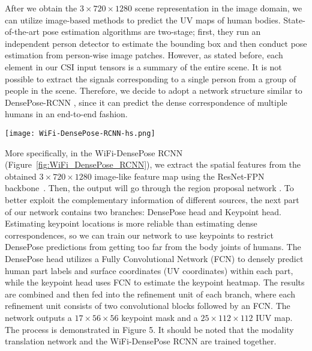 \documentclass[sigconf, anonymous=false]{acmart}
\begin{document}
After we obtain the $3 \times 720 \times 1280$ scene representation in the image domain, we can utilize image-based methods to predict the UV maps of human bodies. State-of-the-art pose estimation algorithms are two-stage; first, they run an independent person detector to estimate the bounding box and then conduct pose estimation from person-wise image patches. However, as stated before, each element in our CSI input tensors is a summary of the entire scene. It is not possible to extract the signals corresponding to a single person from a group of people in the scene. Therefore, we decide to adopt a network structure similar to DensePose-RCNN \cite{DensePose}, since it can predict the dense correspondence of multiple humans in an end-to-end fashion. 

\begin{figure*}[!htb]
\centering
\texttt{[image: WiFi-DensePose-RCNN-hs.png]}
\caption{WiFi-DensePose RCNN. The $3 \times 720 \times 1280$ feature map from Figure~\ref{fig:ModalityTranslation} first goes through standard ResNet-FPN and ROI pooling to extract person-wise features. The features are then processed by two heads:the Keypoint Head and the DensePose Head.} 
\label{fig:WiFi_DensePose_RCNN}
\end{figure*}

More specifically, in the WiFi-DensePose RCNN (Figure~\ref{fig:WiFi_DensePose_RCNN}), we extract the spatial features from the obtained $3 \times 720 \times 1280$ image-like feature map using the ResNet-FPN backbone~\cite{Resnet-fpn}. Then, the output will go through the region proposal network \cite{region_proposal}. To better exploit the complementary information of different sources, the next part of our network contains two branches: DensePose head and Keypoint head. Estimating keypoint locations is more reliable than estimating dense correspondences, so we can train our network to use keypoints to restrict DensePose predictions from getting too far from the body joints of humans. The DensePose head utilizes a Fully Convolutional Network (FCN) \cite{FCN} to densely predict human part labels and surface coordinates (UV coordinates) within each part, while the keypoint head uses FCN to estimate the keypoint heatmap. The results are combined and then fed into the refinement unit of each branch, where each refinement unit consists of two convolutional blocks followed by an FCN. The network outputs a $17 \times 56 \times 56$ keypoint mask and a $25 \times 112 \times 112$ IUV map. The process is demonstrated in Figure 5. It should be noted that the modality translation network and the WiFi-DensePose RCNN are trained together.
\end{document}
